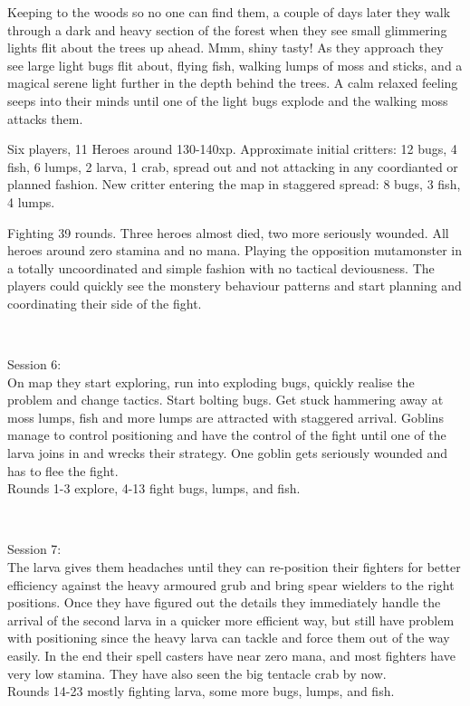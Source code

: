 Keeping to the woods so no one can find them, a couple of days later they walk through a dark and heavy section of the forest when they see small glimmering lights flit about the trees up ahead. Mmm, shiny tasty! As they approach they see large light bugs flit about, flying fish, walking lumps of moss and sticks, and a magical serene light further in the depth behind the trees. A calm relaxed feeling seeps into their minds until one of the light bugs explode and the walking moss attacks them.

Six players, 11 Heroes around 130-140xp. Approximate initial critters: 12 bugs, 4 fish, 6 lumps, 2 larva, 1 crab, spread out and not attacking in any coordianted or planned fashion. New critter entering the map in staggered spread: 8 bugs, 3 fish, 4 lumps.

Fighting 39 rounds. Three heroes almost died, two more seriously wounded. All heroes around zero stamina and no mana.
Playing the opposition mutamonster in a totally uncoordinated and simple fashion with no tactical deviousness. The players could quickly see the monstery behaviour patterns and start planning and coordinating their side of the fight.

\

Session 6:\\                                                            %
On map they start exploring, run into exploding bugs, quickly realise the problem and change tactics. Start bolting bugs. Get stuck hammering away at moss lumps, fish and more lumps are attracted with staggered arrival. Goblins manage to control positioning and have the control of the fight until one of the larva joins in and wrecks their strategy. One goblin gets seriously wounded and has to flee the fight.\\
Rounds 1-3 explore, 4-13 fight bugs, lumps, and fish.

\

Session 7:\\                                                            %
The larva gives them headaches until they can re-position their fighters for better efficiency against the heavy armoured grub and bring spear wielders to the right positions. Once they have figured out the details they immediately handle the arrival of the second larva in a quicker more efficient way, but still have problem with positioning since the heavy larva can tackle and force them out of the way easily. In the end their spell casters have near zero mana, and most fighters have very low stamina. They have also seen the big tentacle crab by now.\\
Rounds 14-23 mostly fighting larva, some more bugs, lumps, and fish.

